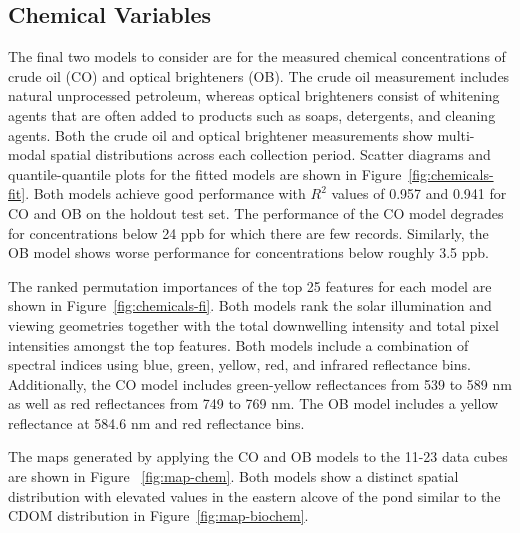 \documentclass[remotesensing,article,submit,pdftex,moreauthors]{Definitions/mdpi}
\begin{document}
\subsection{Chemical Variables}

The final two models to consider are for the measured chemical concentrations of crude oil (CO) and optical brighteners (OB). The crude oil measurement includes natural unprocessed petroleum, whereas optical brighteners consist of whitening agents that are often added to products such as soaps, detergents, and cleaning agents. Both the crude oil and optical brightener measurements show multi-modal spatial distributions across each collection period. Scatter diagrams and quantile-quantile plots for the fitted models are shown in Figure~\ref{fig:chemicals-fit}. Both models achieve good performance with $R^2$ values of 0.957 and 0.941 for CO and OB on the holdout test set. The performance of the CO model degrades for concentrations below 24 ppb for which there are few records. Similarly, the OB model shows worse performance for concentrations below roughly 3.5 ppb.

The ranked permutation importances of the top 25 features for each model are shown in Figure~\ref{fig:chemicals-fi}. Both models rank the solar illumination and viewing geometries together with the total downwelling intensity and total pixel intensities amongst the top features. Both models include a combination of spectral indices using blue, green, yellow, red, and infrared reflectance bins. Additionally, the CO model includes green-yellow reflectances from 539 to 589 nm as well as red reflectances from 749 to 769 nm. The OB model includes a yellow reflectance at 584.6 nm and red reflectance bins.

The maps generated by applying the CO and OB models to the 11-23 data cubes are shown in Figure ~\ref{fig:map-chem}. Both models show a distinct spatial distribution with elevated values in the eastern alcove of the pond similar to the CDOM distribution in Figure~\ref{fig:map-biochem}.
\end{document}
